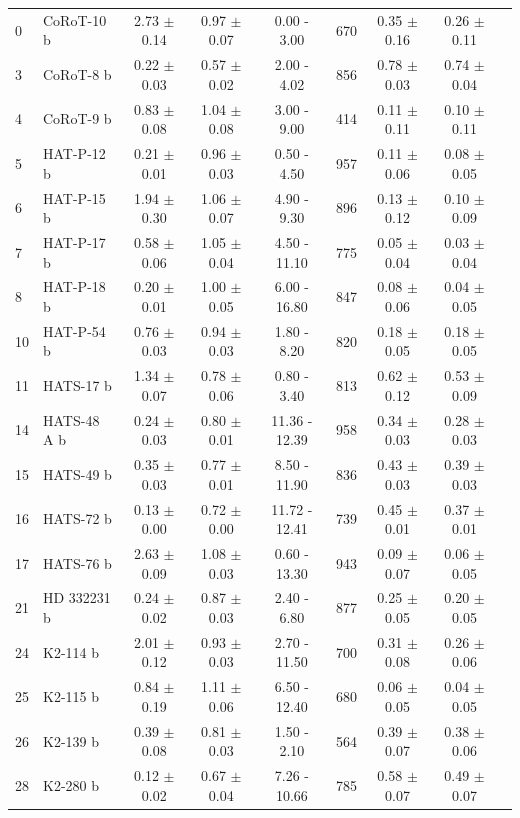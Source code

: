 \begin{longtable}{llccccccc}
0 & CoRoT-10 b & 2.73 $\pm$ 0.14 & 0.97 $\pm$ 0.07 & 0.00 - 3.00 & 670 & 0.35 $\pm$ 0.16 & 0.26 $\pm$ 0.11 \\
3 & CoRoT-8 b & 0.22 $\pm$ 0.03 & 0.57 $\pm$ 0.02 & 2.00 - 4.02 & 856 & 0.78 $\pm$ 0.03 & 0.74 $\pm$ 0.04 \\
4 & CoRoT-9 b & 0.83 $\pm$ 0.08 & 1.04 $\pm$ 0.08 & 3.00 - 9.00 & 414 & 0.11 $\pm$ 0.11 & 0.10 $\pm$ 0.11 \\
5 & HAT-P-12 b & 0.21 $\pm$ 0.01 & 0.96 $\pm$ 0.03 & 0.50 - 4.50 & 957 & 0.11 $\pm$ 0.06 & 0.08 $\pm$ 0.05 \\
6 & HAT-P-15 b & 1.94 $\pm$ 0.30 & 1.06 $\pm$ 0.07 & 4.90 - 9.30 & 896 & 0.13 $\pm$ 0.12 & 0.10 $\pm$ 0.09 \\
7 & HAT-P-17 b & 0.58 $\pm$ 0.06 & 1.05 $\pm$ 0.04 & 4.50 - 11.10 & 775 & 0.05 $\pm$ 0.04 & 0.03 $\pm$ 0.04 \\
8 & HAT-P-18 b & 0.20 $\pm$ 0.01 & 1.00 $\pm$ 0.05 & 6.00 - 16.80 & 847 & 0.08 $\pm$ 0.06 & 0.04 $\pm$ 0.05 \\
10 & HAT-P-54 b & 0.76 $\pm$ 0.03 & 0.94 $\pm$ 0.03 & 1.80 - 8.20 & 820 & 0.18 $\pm$ 0.05 & 0.18 $\pm$ 0.05 \\
11 & HATS-17 b & 1.34 $\pm$ 0.07 & 0.78 $\pm$ 0.06 & 0.80 - 3.40 & 813 & 0.62 $\pm$ 0.12 & 0.53 $\pm$ 0.09 \\
14 & HATS-48 A b & 0.24 $\pm$ 0.03 & 0.80 $\pm$ 0.01 & 11.36 - 12.39 & 958 & 0.34 $\pm$ 0.03 & 0.28 $\pm$ 0.03 \\
15 & HATS-49 b & 0.35 $\pm$ 0.03 & 0.77 $\pm$ 0.01 & 8.50 - 11.90 & 836 & 0.43 $\pm$ 0.03 & 0.39 $\pm$ 0.03 \\
16 & HATS-72 b & 0.13 $\pm$ 0.00 & 0.72 $\pm$ 0.00 & 11.72 - 12.41 & 739 & 0.45 $\pm$ 0.01 & 0.37 $\pm$ 0.01 \\
17 & HATS-76 b & 2.63 $\pm$ 0.09 & 1.08 $\pm$ 0.03 & 0.60 - 13.30 & 943 & 0.09 $\pm$ 0.07 & 0.06 $\pm$ 0.05 \\
21 & HD 332231 b & 0.24 $\pm$ 0.02 & 0.87 $\pm$ 0.03 & 2.40 - 6.80 & 877 & 0.25 $\pm$ 0.05 & 0.20 $\pm$ 0.05 \\
24 & K2-114 b & 2.01 $\pm$ 0.12 & 0.93 $\pm$ 0.03 & 2.70 - 11.50 & 700 & 0.31 $\pm$ 0.08 & 0.26 $\pm$ 0.06 \\
25 & K2-115 b & 0.84 $\pm$ 0.19 & 1.11 $\pm$ 0.06 & 6.50 - 12.40 & 680 & 0.06 $\pm$ 0.05 & 0.04 $\pm$ 0.05 \\
26 & K2-139 b & 0.39 $\pm$ 0.08 & 0.81 $\pm$ 0.03 & 1.50 - 2.10 & 564 & 0.39 $\pm$ 0.07 & 0.38 $\pm$ 0.06 \\
28 & K2-280 b & 0.12 $\pm$ 0.02 & 0.67 $\pm$ 0.04 & 7.26 - 10.66 & 785 & 0.58 $\pm$ 0.07 & 0.49 $\pm$ 0.07 \\

\end{longtable}

